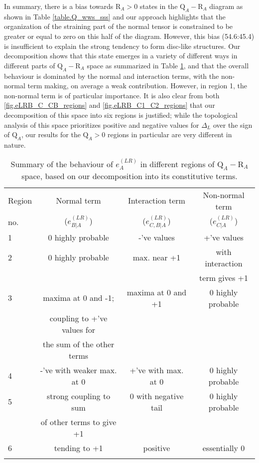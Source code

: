\documentclass[preprint,amssymb,amsmath,aip,cha]{revtex4-1}
\begin{document}
In summary, there is a bias towards $\mbox{R}_{A} > 0$ states in the $\mbox{Q}_{A}-\mbox{R}_{A}$ diagram as shown in Table \ref{table.Q_wws_sss} and our approach highlights that the organization of the straining part of the normal tensor is constrained to be greater or equal to zero on this half of the diagram. However, this bias (54.6:45.4) is insufficient to explain the strong tendency to form disc-like structures. Our decomposition shows that this state emerges in a variety of different ways in different parts of $\mbox{Q}_{A}-\mbox{R}_{A}$ space as summarized in Table \ref{table.LRsummary}, and that the overall behaviour is dominated by the normal and interaction terms, with the non-normal term making, on average a weak contribution. However, in region 1, the non-normal term is of particular importance. It is also clear from both \ref{fig.eLRB_C_CB_regions} and \ref{fig.eLRB_C1_C2_regions} that our decomposition of this space into six regions is justified; while the topological analysis of this space prioritizes positive and negative values for $\Delta_{L}$ over the sign of $\mbox{Q}_{A}$, our results for the $\mbox{Q}_{A} > 0$ regions in particular are very different in nature.

\begin{table}
\caption{Summary of the behaviour of $e^{(LR)}_{A}$ in different regions of $\mbox{Q}_{A}-\mbox{R}_{A}$ space, based on our decomposition into its constitutive terms.}
\centering
\begin{tabular}{lccc}
\noalign{\smallskip}
Region & Normal term & Interaction term & Non-normal term\\
no. & ($e^{(LR)}_{B|A}$) & ($e^{(LR)}_{C,B|A}$) & ($e^{(LR)}_{C|A}$) \\
\noalign{\smallskip}%
1 & 0 highly probable & -'ve values & +'ve values\\
2 & 0 highly probable & max. near +1 & with interaction \\
 & & & term gives +1\\
3 & maxima at 0 and -1; & maxima at 0 and +1 & 0 highly probable \\
 & coupling to +'ve values for & & \\
 & the sum of the other terms & &\\
4 & -'ve with weaker max. at 0 & +'ve with max. at 0 & 0 highly probable\\
5 & strong coupling to sum & 0 with negative tail & 0 highly probable\\
 & of other terms to give +1 & & \\
6 & tending to +1 & positive & essentially 0\\
\noalign{\smallskip}%
\label{table.LRsummary}
\end{tabular}
\end{table}
\end{document}
